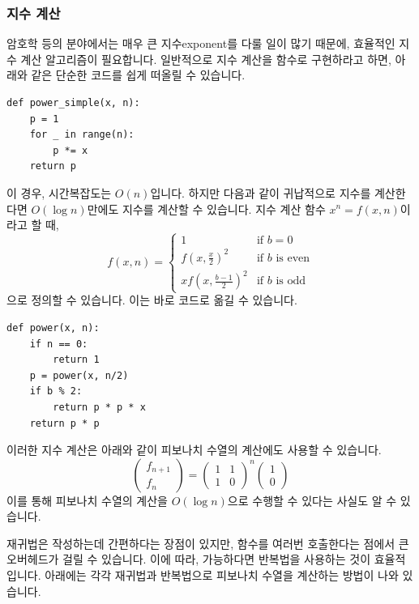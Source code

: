 \documentclass[../main.tex]{subfiles}
\begin{document}
\subsubsection{지수 계산}
암호학 등의 분야에서는 매우 큰 지수exponent를 다룰 일이 많기 때문에, 효율적인 지수 계산 알고리즘이 필요합니다.
일반적으로 지수 계산을 함수로 구현하라고 하면, 아래와 같은 단순한 코드를 쉽게 떠올릴 수 있습니다.
\begin{verbatim}
def power_simple(x, n):
    p = 1
    for _ in range(n):
        p *= x
    return p
\end{verbatim}
이 경우, 시간복잡도는 $O(n)$입니다.
하지만 다음과 같이 귀납적으로 지수를 계산한다면 $O(\log n)$만에도 지수를 계산할 수 있습니다.
지수 계산 함수 $x^n = f(x, n)$이라고 할 때,
\[
f(x, n) = \begin{cases}
1 & \text{if } b = 0\\
f\left(x, \frac x2 \right)^2 & \text{if } b \text{ is even}\\
x f\left(x, \frac{b - 1}{2}\right)^2 & \text{if } b \text{ is odd}
\end{cases}
\]
으로 정의할 수 있습니다.
이는 바로 코드로 옮길 수 있습니다.
\begin{verbatim}
def power(x, n):
    if n == 0:
        return 1
    p = power(x, n/2)
    if b % 2:
        return p * p * x
    return p * p
\end{verbatim}
이러한 지수 계산은 아래와 같이 피보나치 수열의 계산에도 사용할 수 있습니다.
\[
\begin{pmatrix}f_{n + 1} \\ f_n \end{pmatrix} = \begin{pmatrix}1 & 1 \\ 1 & 0 \end{pmatrix}^n \begin{pmatrix} 1 \\ 0 \end{pmatrix}
\]
이를 통해 피보나치 수열의 계산을 $O(\log n)$으로 수행할 수 있다는 사실도 알 수 있습니다.

재귀법은 작성하는데 간편하다는 장점이 있지만, 함수를 여러번 호출한다는 점에서 큰 오버헤드가 걸릴 수 있습니다.
이에 따라, 가능하다면 반복법을 사용하는 것이 효율적입니다.
아래에는 각각 재귀법과 반복법으로 피보나치 수열을 계산하는 방법이 나와 있습니다.
\end{document}
